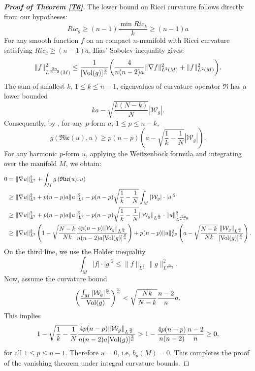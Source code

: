 \documentclass[12pt, twoside]{article}
\theoremstyle{definition}
\numberwithin{equation}{section}
\def\na {\nabla}
\begin{document}
\begin{proof}[\textbf{Proof of Theorem \ref{T6}}]
The lower bound on Ricci curvature follows directly from our hypotheses:
$$Ric_{g}\geq(n-1)\frac{\min Ric_{k} }{k}\geq (n-1)a$$
For any smooth function $f$ on an compact $n$-manifold with Ricci curvature satisfying $Ric_{g}\geq(n-1)a$, Ilias' Sobolev inequality \cite[Page 546]{HV97} gives:
\begin{equation}\label{E4}
\|f\|^{2}_{L^{\frac{2n}{n-2}}(M)}\leq\frac{1}{[{\rm{Vol}}(g)]^{\frac{2}{n} } }\bigg{(}\frac{4}{n(n-2)a}\|\na f\|^{2}_{L^{2}(M)}+\|f\|^{2}_{L^{2}(M)}\bigg{)}.
\end{equation}
The sum of smallest $k$, $1\leq k\leq n-1$, eigenvalues  of curvature operator $\mathfrak{R}$ has a lower bounded
	$$ka-\sqrt{\frac{k(N-k)}{N}}|\mathcal{W}_{g}|.$$
Consequently, by \cite[Lemma 2.1]{PW21a}, for any $p$-form $u$, $1\leq p\leq n-k$,
	\begin{equation*}
	g(\mathfrak{Ric}(u),u)\geq
	p(n-p)\left(a-\sqrt{\frac{1}{k}-\frac{1}{N} }|\mathcal{W}_{g}|\right).
	\end{equation*}
For any harmonic $p$-form $u$, applying the Weitzenböck formula and integrating over the manifold $M$, we obtain:
	\begin{equation*}
	\begin{split}
	0&=\|\na u\|^{2}_{L^{2}}+\int_{M}g\left(\mathfrak{Ric}(u),u\right)\\
	&\geq \|\na u\|^{2}_{L^{2}}+p(n-p)a\|u\|^{2}_{L^{2}}-p(n-p)\sqrt{\frac{1}{k}-\frac{1}{N} }\int_{M}|\mathcal{W}_{g}|\cdot|u|^{2}\\
	&\geq \|\na u\|^{2}_{L^{2}}+p(n-p)a\|u\|^{2}_{L^{2}}-p(n-p)\sqrt{\frac{1}{k}-\frac{1}{N} }\|\mathcal{W}_{g}\|_{L^{\frac{n}{2}}}\cdot\|u\|^{2}_{L^{\frac{2n}{n-2}}}\\
	&\geq \|\na u\|^{2}_{L^{2}}\left(1-\sqrt{\frac{N-k}{Nk} }\frac{4p(n-p)\|\mathcal{W}_{g}\|_{L^{\frac{n}{2}}}}{n(n-2)a[{\rm{Vol}}(g)]^{\frac{2}{n}}} \right)+p(n-p)\|u\|^{2}_{L^{2}}\left(a-\sqrt{\frac{N-k}{Nk} }\frac{\|\mathcal{W}_{g}\|_{L^{\frac{n}{2}}}}{[{\rm{Vol}}(g)]^{\frac{2}{n}}}\right).\\
	\end{split}
	\end{equation*}
	On the third line, we use the Holder inequality
	$$\int_{M}|f|\cdot |g|^{2}\leq \|f\|_{L^{\frac{n}{2} }}\|g\|^{2}_{L^{\frac{2n}{n-2} }}.$$
Now, assume the curvature bound 
	$$\bigg{(}\frac{\int_{M}|\mathcal{W}_{g}|^{\frac{n}{2}}}{{\rm{Vol}}(g)}\bigg{)}^{\frac{2}{n}}<\sqrt{\frac{Nk}{N-k}}\frac{n-2}{n}a.$$ 
This implies
 $$1-\sqrt{\frac{1}{k}-\frac{1}{N} }\frac{4p(n-p)\|\mathcal{W}_{g}\|_{L^{\frac{n}{2}}}}{n(n-2)a[{\rm{Vol}}(g)]^{\frac{2}{n}}}>1-\frac{4p(n-p)}{n(n-2)}\frac{n-2}{n}\geq0,$$
 for all $1\leq p\leq n-1$.
Therefore $u=0$, i.e, $b_{p}(M)=0$. This completes the proof of the vanishing theorem under integral curvature bounds.
\end{proof}
\end{document}
